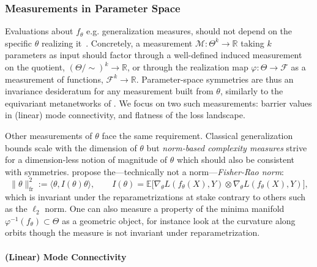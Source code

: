 \documentclass[mathematics,review,submit,moreauthors]{Definitions/mdpi}
\begin{document}
\subsubsection{Measurements in Parameter Space}\label{sec:measurements-param-space}

Evaluations about $f_\theta$ e.g. generalization measures, should not depend on the specific $\theta$ realizing it~\citep{dinh2017}.
Concretely, a measurement $\mathcal M:\Theta^k\to\mathbb R$ taking $k$ parameters as input should factor through a well-defined induced measurement on the quotient, $(\Theta/\!\sim)^k\to\mathbb R$, or through the realization map $\varphi:\Theta\to\mathcal F$ as a measurement of functions, $\mathcal F^k\to\mathbb R$.
Parameter-space symmetries are thus an invariance desideratum for any measurement built from $\theta$, similarly to the equivariant metanetworks of .
We focus on two such measurements: barrier values in (linear) mode connectivity, and flatness of the loss landscape.

\begin{Remark}
    Other measurements of $\theta$ face the same requirement.
    Classical generalization bounds scale with the dimension of $\theta$ but \emph{norm-based complexity measures} strive for a dimension-less notion of magnitude of $\theta$ which should also be consistent with symmetries.
    \citet{liang2019pticais} propose the---technically not a norm---\emph{Fisher-Rao norm}:
    \begin{equation*}
        \lVert\theta\rVert_{\mathrm{fr}}^2:=\langle\theta,I(\theta)\theta\rangle,\qquad I(\theta)=\mathbb E\big[\nabla_\theta L(f_\theta(X),Y)\otimes\nabla_\theta L(f_\theta(X),Y)\big],
    \end{equation*}
    which is invariant under the reparametrizations at stake contrary to others such as the $\ell_2$ norm.
    One can also measure a property of the minima manifold $\varphi^{-1}(f_\theta)\subset\Theta$ as a geometric object, for instance \citet{zhao2024} look at the curvature along orbits though the measure is not invariant under reparametrization.
\end{Remark}

\paragraph{(Linear) Mode Connectivity}\label{sec:mode-connectivity}
\end{document}
